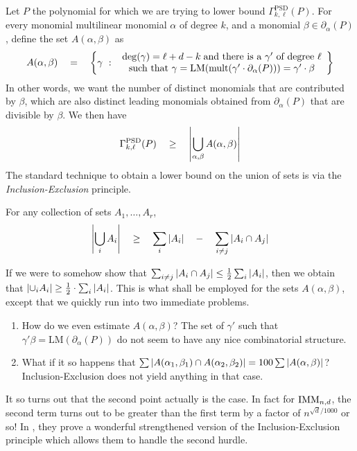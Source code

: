 Let $P$ the polynomial for which we are trying to lower bound $\Gamma^{\mathrm{PSD}}_{k,\ell}(P)$. For every monomial multilinear monomial $\alpha$ of degree $k$, and a monomial $\beta \in \partial_\alpha(P)$, define the set $A(\alpha, \beta)$ as
\[
A(\alpha, \beta) \quad = \quad \left\{{\gamma}\ : \ {\begin{array}{c}\deg(\gamma) = \ell + d - k\;\text{and there is a $\gamma'$ of degree $\ell$}\\\text{such that }\gamma  = \mathrm{LM}(\mathrm{mult}(\gamma' \cdot \partial_\alpha(P))) = \gamma' \cdot \beta \end{array}}\right\}
\]
In other words, we want the number of distinct monomials that are contributed by $\beta$, which are also distinct leading monomials obtained from $\partial_\alpha(P)$ that are divisible by $\beta$. We then have
\begin{equation}\label{eqn:union-of-As}
\Gamma^{\mathrm{PSD}}_{k,\ell}(P) \quad \geq \quad \left|\bigcup_{\alpha, \beta} A(\alpha, \beta)\right|
\end{equation}
The standard technique to obtain a lower bound on the union of sets is via the \emph{Inclusion-Exclusion} principle. 

\begin{lemma}\label{lem:inc-exc}
For any collection of sets $A_1,\dots, A_r$,
\[
\left|\bigcup_i A_i\right| \quad \geq \quad \sum_{i} \left|A_i\right| \quad - \quad \sum_{i\neq j}\left|A_i\cap A_j\right|
\]
\end{lemma}

If we were to somehow show that $\sum_{i\neq j}\left|A_i\cap A_j\right| \leq \frac{1}{2}\sum_i \left|A_i\right|$, then we obtain that $\left|\cup_i A_i\right| \geq \frac{1}{2}\cdot \sum_i \left|A_i\right|$. This is what shall be employed for the sets $A(\alpha, \beta)$, except that we quickly run into two immediate problems. 

\begin{enumerate}
  \item How do we even estimate $A(\alpha, \beta)$? The set of $\gamma'$ such that $\gamma' \beta = \mathrm{LM}(\partial_\alpha(P))$ do not seem to have any nice combinatorial structure. 
  \item What if it so happens that $\sum \left|A(\alpha_1,\beta_1)\cap A(\alpha_2,\beta_2)\right| = 100 \sum \left|A(\alpha,\beta)\right|$? Inclusion-Exclusion does not yield anything in that case. 
\end{enumerate}


It so turns out that the second point actually is the case. In fact for $\mathrm{IMM}_{n,d}$, the second term turns out to be greater than the first term by a factor of $n^{\sqrt{d}/1000}$ or so! In \cite{KS14}, they prove a wonderful strengthened version of the Inclusion-Exclusion principle which allows them to handle the second hurdle. 

